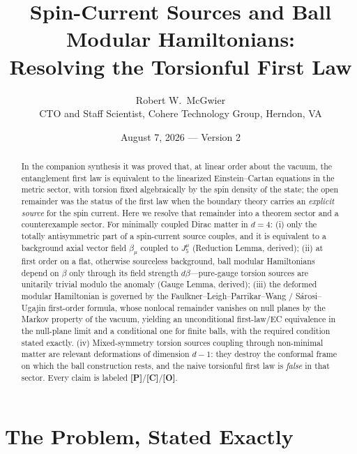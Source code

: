 \documentclass[11pt]{article}
\title{\textbf{Spin-Current Sources and Ball Modular Hamiltonians:\\
Resolving the Torsionful First Law}}
\author{Robert W.\ McGwier\\
\small CTO and Staff Scientist, Cohere Technology Group, Herndon, VA}
\date{August 7, 2026 --- Version 2}
\theoremstyle{definition}
\newcommand{\pP}{\textbf{[P]}}
\newcommand{\pC}{\textbf{[C]}}
\newcommand{\pO}{\textbf{[O]}}
\begin{document}
\maketitle

\begin{abstract}
\noindent
In the companion synthesis \cite{McGwier2026} it was proved that, at linear
order about the vacuum, the entanglement first law is equivalent to the
linearized Einstein--Cartan equations in the metric sector, with torsion
fixed algebraically by the spin density of the state; the open remainder was
the status of the first law when the boundary theory carries an
\emph{explicit source} for the spin current. Here we resolve that remainder
into a theorem sector and a counterexample sector. For minimally coupled
Dirac matter in $d=4$: (i) only the totally antisymmetric part of a
spin-current source couples, and it is equivalent to a background axial
vector field $\beta_\mu$ coupled to $J_5^\mu$ (Reduction Lemma, derived);
(ii) at first order on a flat, otherwise sourceless background, ball modular
Hamiltonians depend on $\beta$ only through its field strength
$d\beta$---pure-gauge torsion sources are unitarily trivial modulo the
anomaly (Gauge Lemma, derived); (iii) the deformed modular Hamiltonian is
governed by the Faulkner--Leigh--Parrikar--Wang / S\'arosi--Ugajin
first-order formula, whose nonlocal remainder vanishes on null planes by the
Markov property of the vacuum, yielding an unconditional first-law/EC
equivalence in the null-plane limit and a conditional one for finite balls,
with the required condition stated exactly. (iv) Mixed-symmetry torsion
sources coupling through non-minimal matter are relevant deformations of
dimension $d-1$: they destroy the conformal frame on which the ball
construction rests, and the naive torsionful first law is \emph{false} in
that sector. Every claim is labeled \pP{}/\pC{}/\pO{}.
\end{abstract}

\section{The Problem, Stated Exactly}
\end{document}

